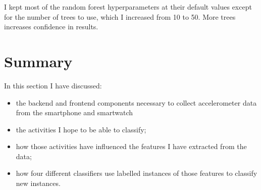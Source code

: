         I kept most of the random forest hyperparameters at their default values except for the number of trees to use, which I increased from 10 to 50. More trees increases confidence in results.
  \section{Summary}
    In this section I have discussed:
    \begin{itemize}
      \item the backend and frontend components necessary to collect accelerometer data from the smartphone and smartwatch
      \item the activities I hope to be able to classify;
      \item how those activities have influenced the features I have extracted from the data;
      \item how four different classifiers use labelled instances of those features to classify new instances.
    \end{itemize}
